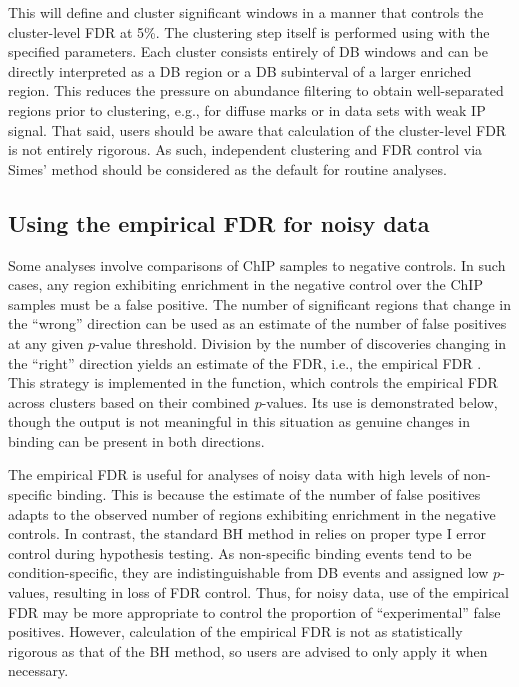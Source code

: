 \documentclass{report}\usepackage[]{graphicx}\usepackage[usenames,dvipsnames]{color}
\newcommand{\hlopt}[1]{\textcolor[rgb]{0,0,0}{#1}}%
\newcommand{\hlstd}[1]{\textcolor[rgb]{0.251,0.251,0.251}{#1}}%
\newcommand{\hlkwb}[1]{\textcolor[rgb]{0,0,0}{#1}}%
\newcommand{\hlkwd}[1]{\textcolor[rgb]{0.878,0.439,0.125}{#1}}%
\newenvironment{knitrout}{}{} %
\begin{document}
This will define and cluster significant windows in a manner that controls the cluster-level FDR at 5\%.
The clustering step itself is performed using  with the specified parameters.
Each cluster consists entirely of DB windows and can be directly interpreted as a DB region or a DB subinterval of a larger enriched region.
This reduces the pressure on abundance filtering to obtain well-separated regions prior to clustering, e.g., for diffuse marks or in data sets with weak IP signal.
That said, users should be aware that calculation of the cluster-level FDR is not entirely rigorous.
As such, independent clustering and FDR control via Simes' method should be considered as the default for routine analyses.

\subsection{Using the empirical FDR for noisy data}
Some analyses involve comparisons of ChIP samples to negative controls.
In such cases, any region exhibiting enrichment in the negative control over the ChIP samples must be a false positive.
The number of significant regions that change in the ``wrong'' direction can be used as an estimate of the number of false positives at any given $p$-value threshold.
Division by the number of discoveries changing in the ``right'' direction yields an estimate of the FDR, i.e., the empirical FDR \cite{zhang2008}.
This strategy is implemented in the  function, which controls the empirical FDR across clusters based on their combined $p$-values.
Its use is demonstrated below, though the output is not meaningful in this situation as genuine changes in binding can be present in both directions.

\begin{knitrout}
\color{fgcolor}
\end{knitrout}

The empirical FDR is useful for analyses of noisy data with high levels of non-specific binding.
This is because the estimate of the number of false positives adapts to the observed number of regions exhibiting enrichment in the negative controls.
In contrast, the standard BH method in  relies on proper type I error control during hypothesis testing.
As non-specific binding events tend to be condition-specific, they are indistinguishable from DB events and assigned low $p$-values, resulting in loss of FDR control.
Thus, for noisy data, use of the empirical FDR may be more appropriate to control the proportion of ``experimental'' false positives.
However, calculation of the empirical FDR is not as statistically rigorous as that of the BH method, so users are advised to only apply it when necessary.
\end{document}

